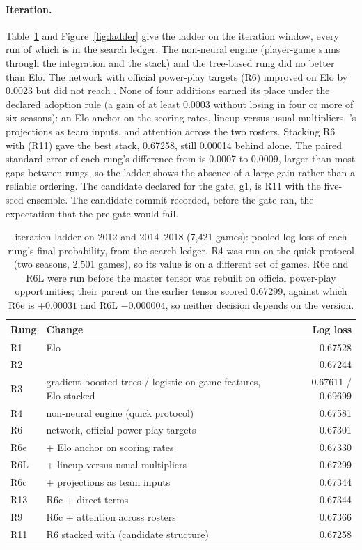 \paragraph{Iteration.}
Table~\ref{tab:ladder} and Figure~\ref{fig:ladder} give the ladder on the
iteration window, every run of which is in the search ledger. The non-neural
engine (player-game sums through the integration and the stack) and the
tree-based rung did no better than Elo. The network with official power-play
targets (R6) improved on Elo by 0.0023 but did not reach \neurhlH{}. None of four
additions earned its place under the declared adoption rule (a gain of at
least 0.0003 without losing in four or more of six seasons): an Elo anchor on
the scoring rates, lineup-versus-usual multipliers, \neurhlH{}'s projections as
team inputs, and attention across the two rosters. Stacking R6 with \neurhlH{}
(R11) gave the best stack, 0.67258, still 0.00014 behind \neurhlH{} alone. The
paired standard error of each rung's difference from \neurhlH{} is 0.0007 to
0.0009, larger than most gaps between rungs, so the ladder shows the absence of
a large gain rather than a reliable ordering. The candidate declared for the
gate, g1, is R11 with the five-seed ensemble. The
candidate commit recorded, before the gate ran, the expectation that the
pre-gate would fail.

\begin{table}[t]
\centering
\small
\caption{\neurhlG{} iteration ladder on 2012 and 2014--2018 (7,421 games): pooled
log loss of each rung's final probability, from the search ledger. R4 was run
on the quick protocol (two seasons, 2,501 games), so its value is on a
different set of games. R6e and R6L were run before the master tensor was
rebuilt on official power-play opportunities; their parent on the earlier
tensor scored 0.67299, against which R6e is $+0.00031$ and R6L $-0.000004$, so
neither decision depends on the version.}
\label{tab:ladder}
\begin{tabular}{llr}
\toprule
Rung & Change & Log loss \\
\midrule
R1 & Elo & 0.67528 \\
R2 & \neurhlH{} & 0.67244 \\
R3 & gradient-boosted trees / logistic on game features, Elo-stacked & 0.67611 / 0.69699 \\
R4 & non-neural engine (quick protocol) & 0.67581 \\
R6 & network, official power-play targets & 0.67301 \\
R6e & + Elo anchor on scoring rates & 0.67330 \\
R6L & + lineup-versus-usual multipliers & 0.67299 \\
R6c & + \neurhlH{} projections as team inputs & 0.67344 \\
R13 & R6c + direct \neurhlH{} terms & 0.67344 \\
R9 & R6c + attention across rosters & 0.67366 \\
R11 & R6 stacked with \neurhlH{} (candidate structure) & 0.67258 \\
\bottomrule
\end{tabular}
\end{table}

